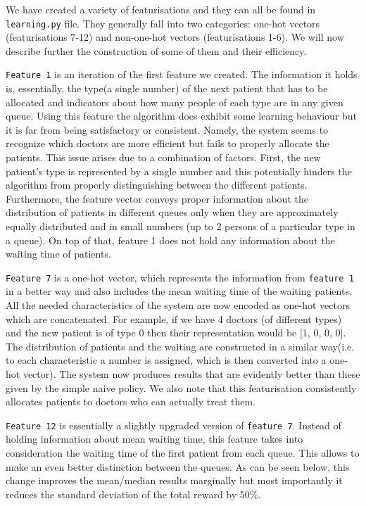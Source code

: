 \documentclass[11point]{article}
\begin{document}
We have created a variety of featurisations and they can all be found in \texttt{learning.py} file. They generally fall into two categories: one-hot vectors (featurisations 7-12) and non-one-hot vectors (featurisations 1-6). We will now describe further the construction of some of them and their efficiency.

\texttt{Feature 1} is an iteration of the first feature we created. The information it holds is, essentially, the type(a single number) of the next patient that has to be allocated and indicators about how many people of each type are in any given queue. Using this feature the algorithm does exhibit some learning behaviour but it is far from being satisfactory or consistent. Namely, the system seems to recognize which doctors are more efficient but fails to properly allocate the patients. This issue arises due to a combination of factors. First, the new patient's type is represented by a single number and this potentially hinders the algorithm from properly distinguishing between the different patients. Furthermore, the feature vector conveys proper information about the distribution of patients in different queues only when they are approximately equally distributed and in small numbers (up to 2 persons of a particular type in a queue). On top of that, feature 1 does not hold any information about the waiting time of patients.

\texttt{Feature 7} is a one-hot vector, which represents the information from \texttt{feature 1} in a better way and also includes the mean waiting time of the waiting patients. All the needed characteristics of the system are now encoded as one-hot vectors which are concatenated. For example, if we have 4 doctors (of different types) and the new patient is of type 0 then their representation would be [1, 0, 0, 0]. The distribution of patients and the waiting are constructed in a similar way(i.e. to each characteristic a number is assigned, which is then converted into a one-hot vector). The system now produces results that are evidently better than these given by the simple naive policy. We also note that this featurisation consistently allocates patients to doctors who can actually treat them. 

\texttt{Feature 12} is essentially a slightly upgraded version of \texttt{feature 7}. Instead of holding information about mean waiting time, this feature takes into consideration the waiting time of the first patient from each queue. This allows to make an even better distinction between the queues. As can be seen below, this change improves the mean/median results marginally but most importantly it reduces the standard deviation of the total reward by 50\%.
\end{document}
